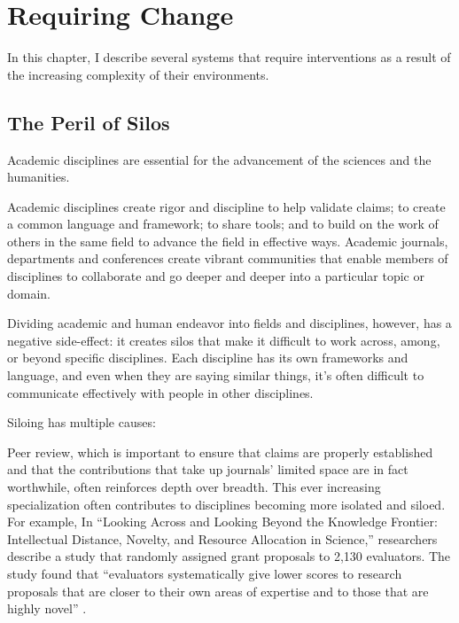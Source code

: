 \chapter{Requiring Change} %
\label{chap:requiring} %

In this chapter, I describe several systems that require interventions as a result of the increasing complexity of their environments.

\section{The Peril of Silos}
\label{sec:silos}

Academic disciplines are essential for the advancement of the sciences and the humanities.

Academic disciplines create rigor and discipline to help validate claims; to create a common language and framework; to share tools; and to build on the work of others in the same field to advance the field in effective ways. Academic journals, departments and conferences create vibrant communities that enable members of disciplines to collaborate and go deeper and deeper into a particular topic or domain.

Dividing academic and human endeavor into fields and disciplines, however, has a negative side-effect: it creates silos that make it difficult to work across, among, or beyond specific disciplines. Each discipline has its own frameworks and language, and even when they are saying similar things, it's often difficult to communicate effectively with people in other disciplines.

Siloing has multiple causes:

Peer review, which is important to ensure that claims are properly established and that the contributions that take up journals' limited space are in fact worthwhile, often reinforces depth over breadth. This ever increasing specialization often contributes to disciplines becoming more isolated and siloed. For example, In ``Looking Across and Looking Beyond the Knowledge Frontier: Intellectual Distance, Novelty, and Resource Allocation in Science,'' researchers describe a study that randomly assigned grant proposals to 2,130 evaluators. The study found that ``evaluators systematically give lower scores to research proposals that are closer to their own areas of expertise and to those that are highly novel'' \cite{boudreau2016looking}.

